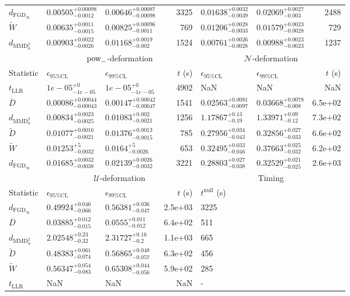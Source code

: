 \begin{tabular}{l|llr|llr}
	$d_{\mathrm{FGD}_{\infty}}$ & $0.00505_{-0.0012}^{+0.00098}$ & $0.00646_{-0.00098}^{+0.00087}$ & 3325 & $0.01638_{-0.0039}^{+0.0032}$ & $0.02069_{-0.003}^{+0.0027}$ & 2488 \\
	$\widetilde{W}$ & $0.00635_{-0.0015}^{+0.0011}$ & $0.00825_{-0.0011}^{+0.00096}$ & 769 & $0.01206_{-0.0033}^{+0.0028}$ & $0.01579_{-0.0028}^{+0.0023}$ & 729 \\
	$d_{\mathrm{MMD}^{2}_{u}}$ & $0.00903_{-0.0026}^{+0.0022}$ & $0.01168_{-0.002}^{+0.0019}$ & 1524 & $0.00761_{-0.0028}^{+0.0026}$ & $0.00988_{-0.0023}^{+0.0023}$ & 1237 \\
	\toprule
	\multicolumn{1}{c}{} & \multicolumn{3}{c}{$\rm{pow}_{-}$-deformation} & \multicolumn{3}{c}{$\mathcal{N}$-deformation} \\
	Statistic & $\epsilon_{95\%\mathrm{CL}}$ & $\epsilon_{99\%\mathrm{CL}}$ & $t$ (s) & $\epsilon_{95\%\mathrm{CL}}$ & $\epsilon_{99\%\mathrm{CL}}$ & $t$ (s) \\
	\midrule
	$t_{\mathrm{LLR}}$ & $1e-05_{-1e-05}^{+0}$ & $1e-05_{-1e-05}^{+0}$ & 4902 & NaN & NaN & NaN \\
	$\overline{D}$ & $0.00086_{-0.00043}^{+0.00044}$ & $0.00147_{-0.00047}^{+0.00042}$ & 1541 & $0.02563_{-0.0097}^{+0.0081}$ & $0.03668_{-0.008}^{+0.0078}$ & 6.5e+02 \\
	$d_{\mathrm{MMD}^{2}_{u}}$ & $0.00834_{-0.0025}^{+0.0023}$ & $0.01083_{-0.0021}^{+0.002}$ & 1256 & $1.17867_{-0.19}^{+0.13}$ & $1.33971_{-0.12}^{+0.09}$ & 7.3e+02 \\
	$\widetilde{D}$ & $0.01077_{-0.0021}^{+0.0016}$ & $0.01376_{-0.0015}^{+0.0013}$ & 785 & $0.27956_{-0.043}^{+0.034}$ & $0.32856_{-0.033}^{+0.027}$ & 6.6e+02 \\
	$\widetilde{W}$ & $0.01253_{-0.0032}^{+5}$ & $0.0164_{-0.0026}^{+5}$ & 653 & $0.32495_{-0.046}^{+0.033}$ & $0.37663_{-0.032}^{+0.025}$ & 6.2e+02 \\
	$d_{\mathrm{FGD}_{\infty}}$ & $0.01685_{-0.0038}^{+0.0032}$ & $0.02139_{-0.0032}^{+0.0026}$ & 3221 & $0.28803_{-0.038}^{+0.027}$ & $0.32529_{-0.025}^{+0.021}$ & 2.6e+03 \\
	\toprule
	\multicolumn{1}{c}{} & \multicolumn{3}{c}{$\mathcal{U}$-deformation} & \multicolumn{3}{c}{Timing} \\
	Statistic & $\epsilon_{95\%\mathrm{CL}}$ & $\epsilon_{99\%\mathrm{CL}}$ & $t$ (s) & $t^{\mathrm{null}}$ (s) \\
	\midrule
	$d_{\mathrm{FGD}_{\infty}}$ & $0.49924_{-0.066}^{+0.046}$ & $0.56381_{-0.047}^{+0.036}$ & 2.5e+03 & 3225 \\
	$\overline{D}$ & $0.03885_{-0.015}^{+0.012}$ & $0.0555_{-0.012}^{+0.011}$ & 6.4e+02 & 511 \\
	$d_{\mathrm{MMD}^{2}_{u}}$ & $2.02548_{-0.32}^{+0.23}$ & $2.31727_{-0.2}^{+0.16}$ & 1.1e+03 & 665 \\
	$\widetilde{D}$ & $0.48383_{-0.074}^{+0.061}$ & $0.56865_{-0.057}^{+0.048}$ & 6.3e+02 & 456 \\
	$\widetilde{W}$ & $0.56347_{-0.083}^{+0.054}$ & $0.65308_{-0.056}^{+0.044}$ & 5.9e+02 & 285 \\
	$t_{\mathrm{LLR}}$ & NaN & NaN & NaN & - \\
	\bottomrule
\end{tabular}